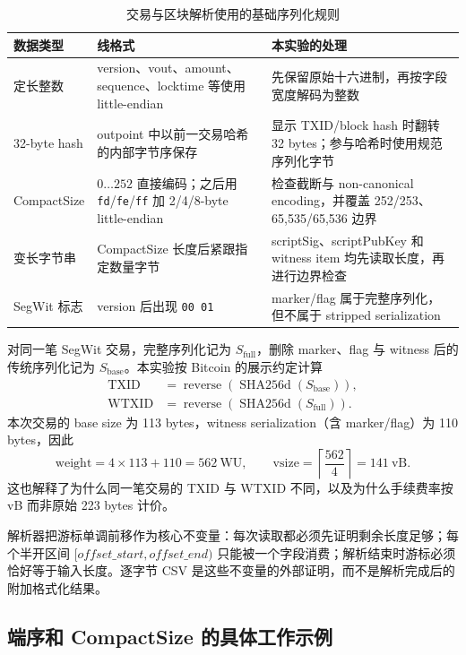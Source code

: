 \documentclass[11pt,a4paper,fontset=none]{ctexart}
\begin{document}
\begin{table}[H]
\centering
\caption{交易与区块解析使用的基础序列化规则}
\label{tab:serialization-rules}
\begin{tabular}{p{}p{}p{}}
\toprule
数据类型 & 线格式 & 本实验的处理 \\
\midrule
定长整数 & version、vout、amount、sequence、locktime 等使用 little-endian & 先保留原始十六进制，再按字段宽度解码为整数 \\
32-byte hash & outpoint 中以前一交易哈希的内部字节序保存 & 显示 TXID/block hash 时翻转 32 bytes；参与哈希时使用规范序列化字节 \\
CompactSize & $0\ldots252$ 直接编码；之后用 \texttt{fd}/\texttt{fe}/\texttt{ff} 加 2/4/8-byte little-endian & 检查截断与 non-canonical encoding，并覆盖 252/253、65,535/65,536 边界 \\
变长字节串 & CompactSize 长度后紧跟指定数量字节 & scriptSig、scriptPubKey 和 witness item 均先读取长度，再进行边界检查 \\
SegWit 标志 & version 后出现 \texttt{00 01} & marker/flag 属于完整序列化，但不属于 stripped serialization \\
\bottomrule
\end{tabular}
\end{table}

对同一笔 SegWit 交易，完整序列化记为 $S_{\mathrm{full}}$，删除 marker、flag 与 witness 后的传统序列化记为 $S_{\mathrm{base}}$。本实验按 Bitcoin 的展示约定计算
\begin{align*}
 \mathrm{TXID}  &= \operatorname{reverse}\!\left(\operatorname{SHA256d}(S_{\mathrm{base}})\right),\\
 \mathrm{WTXID} &= \operatorname{reverse}\!\left(\operatorname{SHA256d}(S_{\mathrm{full}})\right).
\end{align*}
本次交易的 base size 为 113 bytes，witness serialization（含 marker/flag）为 110 bytes，因此
\[
 \mathrm{weight}=4\times113+110=562\ \mathrm{WU},\qquad
 \mathrm{vsize}=\left\lceil\frac{562}{4}\right\rceil=141\ \mathrm{vB}.
\]
这也解释了为什么同一笔交易的 TXID 与 WTXID 不同，以及为什么手续费率按 vB 而非原始 223 bytes 计价。

解析器把游标单调前移作为核心不变量：每次读取都必须先证明剩余长度足够；每个半开区间 $[\textit{offset\_start},\textit{offset\_end})$ 只能被一个字段消费；解析结束时游标必须恰好等于输入长度。逐字节 CSV 是这些不变量的外部证明，而不是解析完成后的附加格式化结果。

\subsection{端序和 CompactSize 的具体工作示例}
\end{document}
